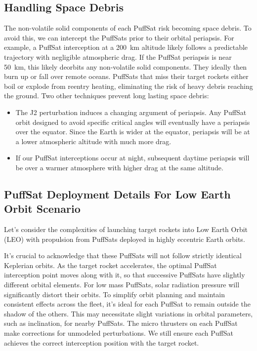 \documentclass{article}
\begin{document}
{\subsection{Handling Space Debris} \label{sec:handling_space_debris}
The non-volatile solid components of each PuffSat risk becoming space debris. To avoid this, we can intercept the PuffSats prior to their orbital periapsis.  For example, a PuffSat interception at a \SI{200}{\kilo\meter} altitude likely follows a predictable trajectory with negligible atmospheric drag.   If the PuffSat periapsis is near \SI{50}{\kilo\meter}, this likely deorbits any non-volatile solid components.   They ideally then burn up or fall over remote oceans.  PuffSats that miss their target rockets either boil or explode from reentry heating, eliminating the risk of heavy debris reaching the ground. Two other techniques prevent long lasting space debris:

\begin{itemize}
\item The J2 perturbation induces a changing argument of periapsis. Any PuffSat orbit designed to avoid specific critical angles will eventually have a periapsis over the equator.  Since the Earth is wider at the equator, periapsis will be at a lower atmospheric altitude with much more drag.
\item If our PuffSat interceptions occur at night, subsequent daytime periapsis will be over a warmer atmosphere with higher drag at the same altitude.
\end{itemize}

\subsection{PuffSat Deployment Details For Low Earth Orbit Scenario}
Let's consider the complexities of launching target rockets into Low Earth Orbit (LEO) with propulsion from PuffSats deployed in highly eccentric Earth orbits.

It's crucial to acknowledge that these PuffSats will not follow strictly identical Keplerian orbits. As the target rocket accelerates, the optimal PuffSat interception point moves along with it, so that successive PuffSats have slightly different orbital elements.
For low mass PuffSats, solar radiation pressure will significantly distort their orbits. To simplify orbit planning and maintain consistent  effects across the fleet, it's ideal for each PuffSat to remain outside the shadow of the others. This may necessitate slight variations in orbital parameters, such as inclination, for nearby PuffSats. The micro thrusters on each PuffSat  make corrections for unmodeled perturbations.  We still ensure each PuffSat achieves the correct interception position with the target rocket.   

}
\end{document}
